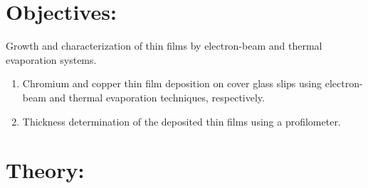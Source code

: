 \documentclass[]{report}[12 pt]
\begin{document}
	
	\section*{Objectives:}
	 Growth and characterization of thin films by electron-beam and thermal evaporation
	systems.
	\begin{enumerate}
	\item Chromium and copper thin film deposition on cover glass slips using electron-beam and
	thermal evaporation techniques, respectively.
	\item Thickness determination of the deposited thin films using a profilometer.
	\end{enumerate}
	\section*{Theory:}
\end{document}
